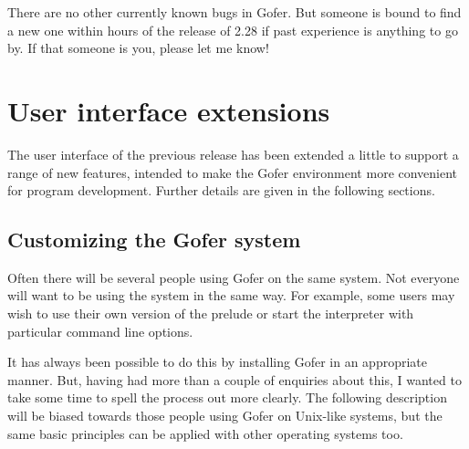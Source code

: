 There are no other currently known bugs in Gofer.  But someone is bound
to find a new one within hours of the release of 2.28 if past
experience is anything to go by.  If that someone is you, please let me
know!


\section{User interface extensions}

The user interface of the previous release has been extended a little
to support a range of new features, intended to make the Gofer
environment more convenient for program development.  Further details
are given in the following sections.

\subsection{Customizing the Gofer system}
Often there will be several people using Gofer on the same system.  Not
everyone will want to be using the system in the same way.  For example,
some users may wish to use their own version of the prelude or start the
interpreter with particular command line options.

It has always been possible to do this by installing Gofer in an
appropriate manner.  But, having had more than a couple of enquiries
about this, I wanted to take some time to spell the process out more
clearly.  The following description will be biased towards those people
using Gofer on Unix-like systems, but the same basic principles can be
applied with other operating systems too.

